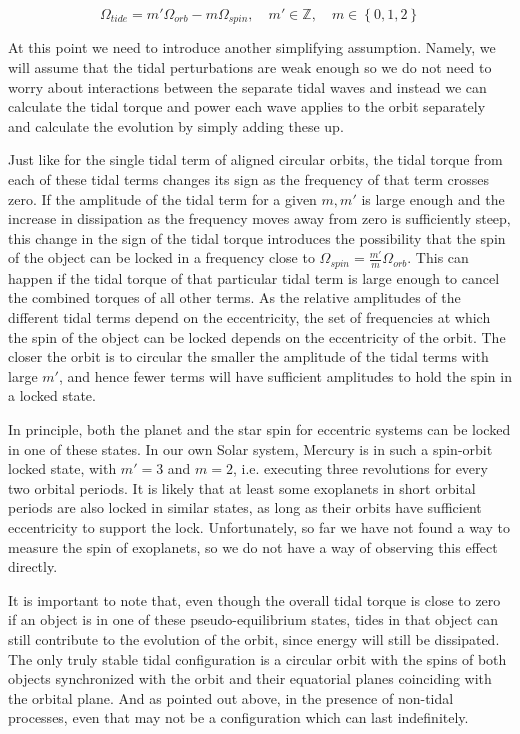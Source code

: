 \begin{equation}
%
    \Omega_{tide} = m' \Omega_{orb} - m \Omega_{spin},
%
    \quad m' \in \mathbb{Z},\quad m \in \left\{0, 1, 2\right\}
%
\end{equation}

At this point we need to introduce another simplifying assumption. Namely, we
will assume that the tidal perturbations are weak enough so we do not need to
worry about interactions between the separate tidal waves and instead we can
calculate the tidal torque and power each wave applies to the orbit separately
and calculate the evolution by simply adding these up.

Just like for the single tidal term of aligned circular orbits, the tidal torque
from each of these tidal terms changes its sign as the frequency of that term
crosses zero. If the amplitude of the tidal term for a given $m,m'$ is large
enough and the increase in dissipation as the frequency moves away from zero is
sufficiently steep, this change in the sign of the tidal torque introduces the
possibility that the spin of the object can be locked in a frequency close to
$\Omega_{spin}=\frac{m'}{m} \Omega_{orb}$. This can happen if the tidal torque
of that particular tidal term is large enough to cancel the combined torques of
all other terms. As the relative amplitudes of the different tidal terms depend
on the eccentricity, the set of frequencies at which the spin of the object can
be locked depends on the eccentricity of the orbit. The closer the orbit is to
circular the smaller the amplitude of the tidal terms with large $m'$, and hence
fewer terms will have sufficient amplitudes to hold the spin in a locked state.

In principle, both the planet and the star spin for eccentric systems can be
locked in one of these states. In our own Solar system, Mercury is in such a
spin-orbit locked state, with $m'=3$ and $m=2$, i.e. executing three revolutions
for every two orbital periods. It is likely that at least some exoplanets in
short orbital periods are also locked in similar states, as long as their orbits
have sufficient eccentricity to support the lock. Unfortunately, so far we have
not found a way to measure the spin of exoplanets, so we do not have a way of
observing this effect directly.

It is important to note that, even though the overall tidal torque is close to
zero if an object is in one of these pseudo-equilibrium states, tides in that
object can still contribute to the evolution of the orbit, since energy will
still be dissipated. The only truly stable tidal configuration is a circular
orbit with the spins of both objects synchronized with the orbit and their
equatorial planes coinciding with the orbital plane. And as pointed out above,
in the presence of non-tidal processes, even that may not be a configuration
which can last indefinitely.
